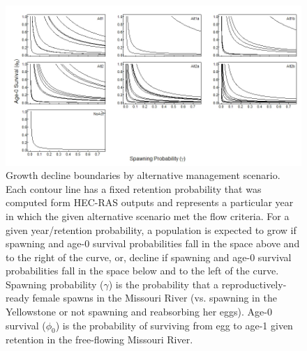 \documentclass[12pt]{article}
\begin{document}
\begin{figure}[h]
\centering
\hspace*{-0.5in}\includegraphics[width=7.5in]{NEPA_Fig_10-boundaries-year-within-alternative}
\caption{Growth decline boundaries by alternative management scenario.  Each contour line has a fixed retention probability that was computed form HEC-RAS outputs and represents a particular year in which the given alternative scenario met the flow criteria.   For a given year/retention probability, a population is expected to grow if spawning and age-0 survival probabilities fall in the space above and to the right of the curve, or, decline if spawning and age-0 survival probabilities fall in the space below and to the left of the curve. Spawning probability ($\gamma$) is the probability that a reproductively-ready female spawns in the Missouri River (vs. spawning in the Yellowstone or not spawning and reabsorbing her eggs).  Age-0 survival ($\phi_0$) is the probability of surviving from egg to age-1 given retention in the free-flowing Missouri River.}
\label{YwiA}
\end{figure}
\end{document}
